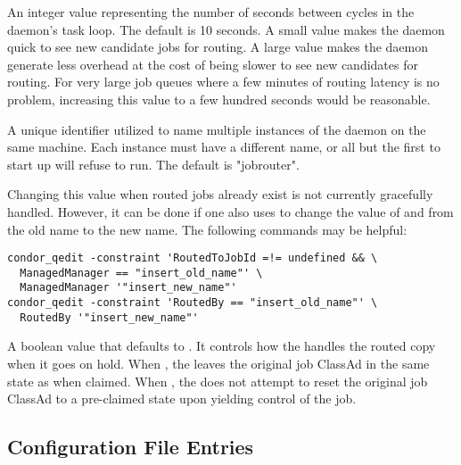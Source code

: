 \begin{description}
\label{JobRouterPollingPeriod}
\item[\Macro{JOB\_ROUTER\_POLLING\_PERIOD}]
  An integer value representing the number of seconds
  between cycles in the  daemon's task loop.
  The default is 10 seconds.
  A small value makes the  daemon 
  quick to see new candidate jobs for routing.
  A large value makes the  daemon generate less
  overhead at the cost of being slower to see new candidates for routing.
  For very large job queues where a few minutes of
  routing latency is no problem, increasing this value to a few
  hundred seconds would be reasonable.

\label{JobRouterName}
\item[\Macro{JOB\_ROUTER\_NAME}]
  A unique identifier utilized to name multiple instances of
  the  daemon on the same machine.
  Each instance must have a different name,
  or all but the first to start up will refuse to run.
  The default is "jobrouter".

  Changing this value when routed jobs already exist is not currently
  gracefully handled.  However, it can be done if one also uses
   to change the value of  and
   from the old name to the new name.  The following commands
  may be helpful:

\begin{verbatim}
condor_qedit -constraint 'RoutedToJobId =!= undefined && \
  ManagedManager == "insert_old_name"' \
  ManagedManager '"insert_new_name"'
condor_qedit -constraint 'RoutedBy == "insert_old_name"' \
  RoutedBy '"insert_new_name"'
\end{verbatim}

\label{JobRouterReleaseOnHold}
\item[\Macro{JOB\_ROUTER\_RELEASE\_ON\_HOLD}]
  A boolean value that defaults to .
  It controls how the  handles the routed copy when it
  goes on hold.
  When \Expr{True}, the  leaves the original job 
  ClassAd in the same state as when claimed.  When \Expr{False},
  the \Condor{job\_router} does not attempt to reset the original job
  ClassAd to a pre-claimed state upon yielding control of the job.

\end{description}



\subsection{\label{sec:LeaseManager-Config-File-Entries}
Configuration File Entries}

